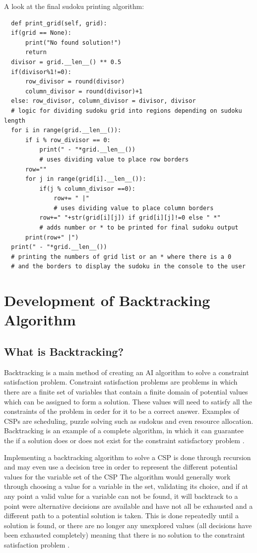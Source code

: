 \documentclass[]{final_report}
\begin{document}
A look at the final sudoku printing algorithm:
\begin{verbatim}
  def print_grid(self, grid):
  if(grid == None):
      print("No found solution!")
      return
  divisor = grid.__len__() ** 0.5
  if(divisor%1!=0):
      row_divisor = round(divisor)
      column_divisor = round(divisor)+1
  else: row_divisor, column_divisor = divisor, divisor
  # logic for dividing sudoku grid into regions depending on sudoku length
  for i in range(grid.__len__()):
      if i % row_divisor == 0:
          print(" - "*grid.__len__())
          # uses dividing value to place row borders
      row=""
      for j in range(grid[i].__len__()):
          if(j % column_divisor ==0):
              row+= " |"
              # uses dividing value to place column borders
          row+=" "+str(grid[i][j]) if grid[i][j]!=0 else " *"
          # adds number or * to be printed for final sudoku output
      print(row+" |")
  print(" - "*grid.__len__())
  # printing the numbers of grid list or an * where there is a 0
  # and the borders to display the sudoku in the console to the user
\end{verbatim}

\section{Development of Backtracking Algorithm}
\subsection{What is Backtracking?}

Backtracking is a main method of creating an AI algorithm to solve a constraint satisfaction problem. Constraint satisfaction problems are problems in which there are a finite set of variables that contain a finite domain of potential values which can be assigned to form a solution. These values will need to satisfy all the constraints of the problem in order for it to be a correct answer. Examples of CSPs are scheduling, puzzle solving such as sudokus and even resource allocation. Backtracking is an example of a complete algorithm, in which it can guarantee the if a solution does or does not exist for the constraint satisfactory problem \cite{Brailsford1999}. 

Implementing a backtracking algorithm to solve a CSP is done through recursion and may even use a decision tree in order to represent the different potential values for the variable set of the CSP \cite{vanBeek2006} 
The algorithm would generally work through choosing a value for a variable in the set, validating its choice, and if at any point a valid value for a variable can not be found, it will backtrack to a point were alternative decisions are available and have not all be exhausted and a different path to a potential solution is taken. This is done repeatedly until a solution is found, or there are no longer any unexplored values (all decisions have been exhausted completely) meaning that there is no solution to the constraint satisfaction problem \cite{Melanie2024}. 
\end{document}
